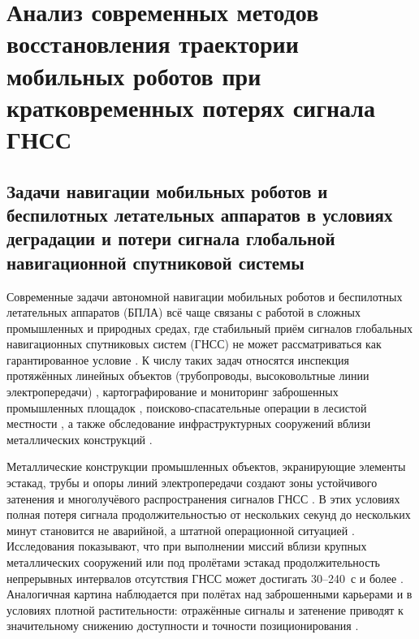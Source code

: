 
\chapter{Анализ современных методов восстановления траектории мобильных роботов при кратковременных потерях сигнала ГНСС}
\label{ch:intro}

\section{Задачи навигации мобильных роботов и беспилотных летательных аппаратов в условиях деградации и потери сигнала глобальной навигационной спутниковой системы}
\label{sec:1.1}

Современные задачи автономной навигации мобильных роботов и беспилотных летательных аппаратов (БПЛА) всё чаще связаны с работой в сложных промышленных и природных средах, где стабильный приём сигналов глобальных навигационных спутниковых систем (ГНСС) не может рассматриваться как гарантированное условие \cite{Tavasci2024, Pang2024, Kim2023, Alaba2024}. К числу таких задач относятся инспекция протяжённых линейных объектов (трубопроводы, высоковольтные линии электропередачи) \cite{Kim2023, Wang2025, uav_inspection}, картографирование и мониторинг заброшенных промышленных площадок \cite{Kim2023, Dlamini2025}, поисково-спасательные операции в лесистой местности \cite{Pang2024, Tavasci2024}, а также обследование инфраструктурных сооружений вблизи металлических конструкций \cite{Tavasci2024, Pang2024, uav_inspection}.

Металлические конструкции промышленных объектов, экранирующие элементы эстакад, трубы и опоры линий электропередачи создают зоны устойчивого затенения и многолучёвого распространения сигналов ГНСС \cite{Tavasci2024, Kim2023, Wang2025}. В этих условиях полная потеря сигнала продолжительностью от нескольких секунд до нескольких минут становится не аварийной, а штатной операционной ситуацией \cite{Pang2024, Tavasci2024, Niu2026}. Исследования показывают, что при выполнении миссий вблизи крупных металлических сооружений или под пролётами эстакад продолжительность непрерывных интервалов отсутствия ГНСС может достигать 30–240~с и более \cite{Tavasci2024, Pang2024, Niu2026}. Аналогичная картина наблюдается при полётах над заброшенными карьерами и в условиях плотной растительности: отражённые сигналы и затенение приводят к значительному снижению доступности и точности позиционирования \cite{Kim2023, Pang2024, Tavasci2024}.

